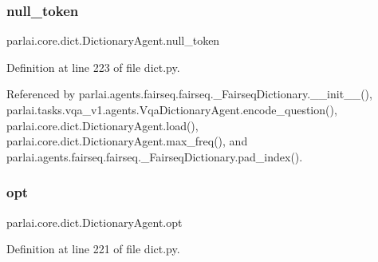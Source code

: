 \subsubsection{\texorpdfstring{null\+\_\+token}{null\_token}}
{\footnotesize\ttfamily parlai.\+core.\+dict.\+Dictionary\+Agent.\+null\+\_\+token}



Definition at line 223 of file dict.\+py.



Referenced by parlai.\+agents.\+fairseq.\+fairseq.\+\_\+\+Fairseq\+Dictionary.\+\_\+\+\_\+init\+\_\+\+\_\+(), parlai.\+tasks.\+vqa\+\_\+v1.\+agents.\+Vqa\+Dictionary\+Agent.\+encode\+\_\+question(), parlai.\+core.\+dict.\+Dictionary\+Agent.\+load(), parlai.\+core.\+dict.\+Dictionary\+Agent.\+max\+\_\+freq(), and parlai.\+agents.\+fairseq.\+fairseq.\+\_\+\+Fairseq\+Dictionary.\+pad\+\_\+index().

\mbox{\label{classparlai_1_1core_1_1dict_1_1DictionaryAgent_a6c0d7c9c31b38e99b747be88395d689f}} 
\subsubsection{\texorpdfstring{opt}{opt}}
{\footnotesize\ttfamily parlai.\+core.\+dict.\+Dictionary\+Agent.\+opt}



Definition at line 221 of file dict.\+py.



